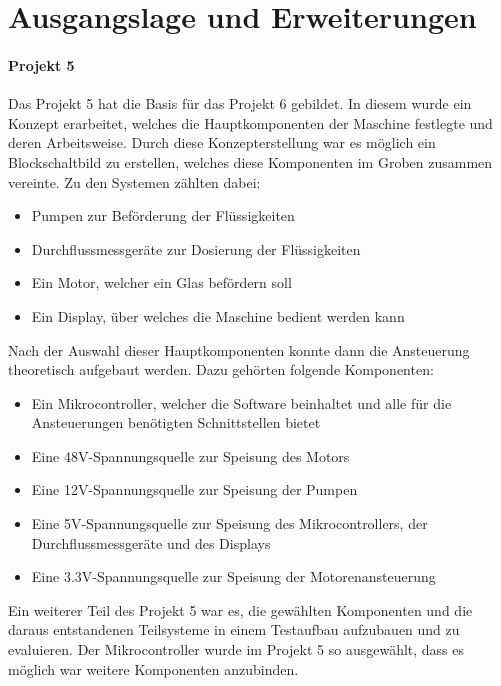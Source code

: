 \section{Ausgangslage und Erweiterungen}
\label{sec:Ausgangslage und Erweiterungen}

\paragraph{Projekt 5}\mbox{}

Das Projekt 5 hat die Basis für das Projekt 6 gebildet. In diesem wurde ein Konzept erarbeitet, welches die Hauptkomponenten der Maschine festlegte und deren Arbeitsweise. Durch diese Konzepterstellung war es möglich ein Blockschaltbild zu erstellen, welches diese Komponenten im Groben zusammen vereinte. Zu den Systemen zählten dabei: 

\begin{itemize}
\item Pumpen zur Beförderung der Flüssigkeiten
\item Durchflussmessgeräte zur Dosierung der Flüssigkeiten
\item Ein Motor, welcher ein Glas befördern soll
\item Ein Display, über welches die Maschine bedient werden kann
\end{itemize}
\mbox{}

Nach der Auswahl dieser Hauptkomponenten konnte dann die Ansteuerung theoretisch aufgebaut werden. Dazu gehörten folgende Komponenten:

\begin{itemize}
\item Ein Mikrocontroller, welcher die Software beinhaltet und alle für die Ansteuerungen benötigten Schnittstellen bietet 
\item Eine 48V-Spannungsquelle zur Speisung des Motors
\item Eine 12V-Spannungsquelle zur Speisung der Pumpen
\item Eine 5V-Spannungsquelle zur Speisung des Mikrocontrollers, der Durchflussmessgeräte und des Displays
\item Eine 3.3V-Spannungsquelle zur Speisung der Motorenansteuerung
\end{itemize}
\mbox{}

Ein weiterer Teil des Projekt 5 war es, die gewählten Komponenten und die daraus entstandenen Teilsysteme in einem Testaufbau aufzubauen und zu evaluieren. Der Mikrocontroller wurde im Projekt 5 so ausgewählt, dass es möglich war weitere Komponenten anzubinden. 

